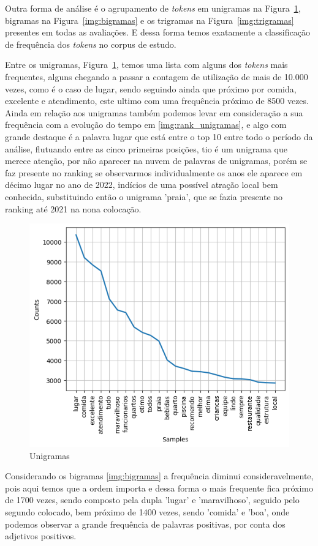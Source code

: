 Outra forma de análise é o agrupamento de \textit{tokens} em unigramas na Figura~\ref{img:unigramas}, bigramas na Figura~\ref{img:bigramas} e os trigramas na Figura~\ref{img:trigramas} presentes em todas as avaliações. E dessa forma temos exatamente a classificação de frequência dos \textit{tokens} no corpus de estudo.

Entre os unigramas, Figura~\ref{img:unigramas}, temos uma lista com alguns dos \textit{tokens} mais frequentes, alguns chegando a passar a contagem de utilização de mais de 10.000 vezes, como é o caso de lugar, sendo seguindo ainda que próximo por comida, excelente e atendimento, este ultimo com uma frequência próximo de 8500 vezes. Ainda em relação aos unigramas também podemos levar em consideração a sua frequência com a evolução do tempo em \ref{img:rank_unigramas}, e algo com grande destaque é a palavra lugar que está entre o top 10 entre todo o período da análise, flutuando entre as cinco primeiras posições, tio é um unigrama que merece atenção, por não aparecer na nuvem de palavras de unigramas, porém se faz presente no ranking se observarmos individualmente os anos ele aparece em décimo lugar no ano de 2022, indícios de uma possível atração local bem conhecida, substituindo então o unigrama 'praia', que se fazia presente no ranking até 2021 na nona colocação.

\begin{figure}
	\centering
	\includegraphics[width=.8\textwidth]{figs/exploratoria/unigramas.png}
	\caption{Unigramas}
	\label{img:unigramas}
\end{figure}

Considerando os bigramas \ref{img:bigramas} a frequência diminui consideravelmente, pois aqui temos que a ordem importa e dessa forma o mais frequente fica próximo de 1700 vezes, sendo composto pela dupla 'lugar' e 'maravilhoso', seguido pelo segundo colocado, bem próximo de 1400 vezes, sendo 'comida' e 'boa', onde podemos observar a grande frequência de palavras positivas, por conta dos adjetivos positivos.

